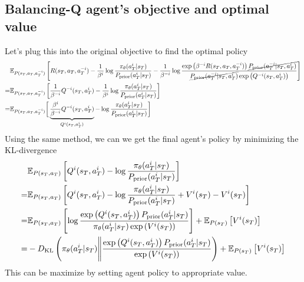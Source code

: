 \subsection{Balancing-Q agent's objective and optimal value}
\label{appx:chap4-balancing-q-agent-objective-optim}
Let's plug this into the original objective to find the optimal policy 
\begin{equation*}
\begin{aligned}
    &\mathbb{E}_{P(s_T, a_T, a^{-i}_T)}\left[ R(s_T, a_T, a^{-i}_T) - \frac{1}{\beta^i} \log\frac{\pi_{\theta}(a^i_T|s_T)}{P_{\operatorname{prior}}(a^i_T|s_T)} - \frac{1}{\beta^{-i}}\log \frac{ \exp\left( \beta^{-i} R(s_T, a_T, a^{-i}_T) \right) \cancel{P_{\text{prior}}(a^{-i}_T|s_T, a^i_T)}}{\cancel{P_{\operatorname{prior}}(a^{-i}_T|s_T, a^i_T)}\exp\left( Q^{-i}(s_T, a^{i}_T) \right)} \right]    \\
    =& \mathbb{E}_{P(s_T, a_T, a^{-i}_T)}\left[  \frac{1}{\beta^{-i}} Q^{-i}(s_T, a^{i}_T) - \frac{1}{\beta^i} \log\frac{\pi_{\theta}(a^i_T|s_T)}{P_{\operatorname{prior}}(a^i_T|s_T)} \right]\\
     =& \mathbb{E}_{P(s_T, a_T, a^{-i}_T)}\bigg[ \underbrace{\frac{\beta^i}{\beta^{-i}} Q^{-i}(s_T, a^{i}_T)}_{Q^i(s_T, a^{i}_T)} - \log\frac{\pi_{\theta}(a^i_T|s_T)}{P_{\operatorname{prior}}(a^i_T|s_T)}\bigg]\\
\end{aligned}
\end{equation*} 
Using the same method, we can we get the final agent's policy by minimizing the KL-divergence 
\begin{equation*}
\begin{aligned}
    &\mathbb{E}_{P(s_T, a_T)}\left[ Q^i(s_T, a^{i}_T) - \log\frac{\pi_{\theta}(a^i_T|s_T)}{P_{\operatorname{prior}}(a^i_T|s_T)} \right] \\
    =& \mathbb{E}_{P(s_T, a_T)}\left[ Q^i(s_T, a^{i}_T) - \log\frac{\pi_{\theta}(a^i_T|s_T)}{P_{\operatorname{prior}}(a^i_T|s_T)} + V^i(s_T)  - V^i(s_T) \right] \\
    =& \mathbb{E}_{P(s_T, a_T)}\left[  \log\frac{ \exp\left( Q^i(s_T, a^{i}_T) \right)P_{\operatorname{prior}}(a^i_T|s_T)} {\pi_{\theta}(a^i_T|s_T)\exp\left( V^i(s_T) \right)} \right] + \mathbb{E}_{P(s_T)}\left[  V^i(s_T) \right] \\
    =& -D_{\mathrm{KL}}\left( \pi_{\theta}(a^i_T|s_T) \Bigg\| \frac{ \exp\left( Q^i(s_T, a^{i}_T) \right)P_{\operatorname{prior}}(a^i_T|s_T)} {\exp\left( V^i(s_T) \right)}  \right)  + \mathbb{E}_{P(s_T)}\left[  V^i(s_T) \right]
\end{aligned}
\end{equation*}
This can be maximize by setting agent policy to appropriate value.

